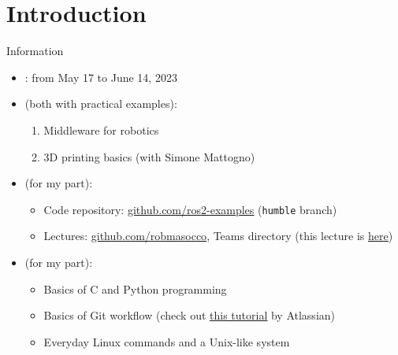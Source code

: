 
\section{Introduction}
\graphicspath{{figs/section1/}}

\begin{frame}{Information}
  \begin{itemize}
    \item {}: from May 17 to June 14, 2023
    \item {} (both with practical examples):
      \begin{enumerate}
        \item Middleware for robotics
        \item 3D printing basics (with Simone Mattogno)
      \end{enumerate}
    \item {} (for my part):
      \begin{itemize}
        \item Code repository: \href{https://github.com/IntelligentSystemsLabUTV/ros2-examples}{\color{blue}\underline{github.com/ros2-examples}} (\texttt{humble} branch)
        \item Lectures: \href{https://github.com/stars/robmasocco/lists/lectures}{\color{blue}\underline{github.com/robmasocco}}, Teams directory (this lecture is \href{https://github.com/robmasocco/DAFN23_Robotics_1}{\color{blue}\underline{here}})
      \end{itemize}
    \item {} (for my part):
      \begin{itemize}
        \item Basics of C and Python programming
        \item Basics of Git workflow (check out \href{https://www.atlassian.com/git/tutorials/what-is-git}{\color{blue}\underline{this tutorial}} by Atlassian)
        \item Everyday Linux commands and a Unix-like system
      \end{itemize}
  \end{itemize}
\end{frame}

